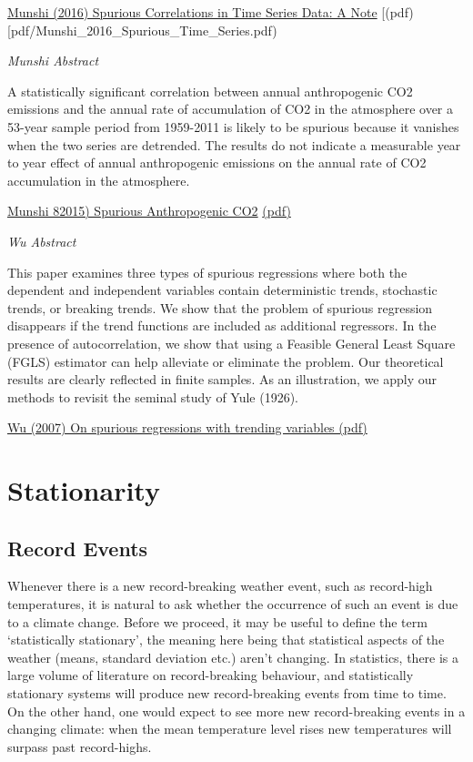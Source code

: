 \documentclass[
]{book}
\begin{document}
\href{https://www.researchgate.net/publication/306376553_Spurious_Correlations_in_Time_Series_Data_A_Note}{Munshi (2016) Spurious Correlations in Time Series Data: A Note}
{[}(pdf){[}pdf/Munshi\_2016\_Spurious\_Time\_Series.pdf)

\emph{Munshi Abstract}

A statistically significant correlation between annual anthropogenic CO2 emissions and the annual rate of accumulation of CO2 in the atmosphere over a 53-year sample period from 1959-2011 is likely to be spurious because it vanishes when the two series are detrended. The results do not indicate a measurable year to year effect of annual anthropogenic emissions on the annual rate of CO2 accumulation in the atmosphere.

\href{https://papers.ssrn.com/sol3/papers.cfm?abstract_id=2642639}{Munshi 82015) Spurious Anthropogenic CO2}
\href{pdf/Munshi_2015_Spurious_Antropogenic_CO2.pdf}{(pdf)}

\emph{Wu Abstract}

This paper examines three types of spurious regressions where both the dependent and
independent variables contain deterministic trends, stochastic trends, or breaking trends. We
show that the problem of spurious regression disappears if the trend functions are included as
additional regressors. In the presence of autocorrelation, we show that using a Feasible General
Least Square (FGLS) estimator can help alleviate or eliminate the problem. Our theoretical
results are clearly reflected in finite samples. As an illustration, we apply our methods to revisit
the seminal study of Yule (1926).

\href{pdf/Wu_2007_Spurious_Trending.pdf}{Wu (2007) On spurious regressions with trending variables (pdf)}

\hypertarget{stationarity}{%
\chapter{Stationarity}\label{stationarity}}

\hypertarget{record-events}{%
\section{Record Events}\label{record-events}}

Whenever there is a new record-breaking weather event, such as record-high temperatures, it is natural to ask whether the occurrence of such an event is due to a climate change. Before we proceed, it may be useful to define the term `statistically stationary', the meaning here being that statistical aspects of the weather (means, standard deviation etc.) aren't changing. In statistics, there is a large volume of literature on record-breaking behaviour, and statistically stationary systems will produce new record-breaking events from time to time. On the other hand, one would expect to see more new record-breaking events in a changing climate: when the mean temperature level rises new temperatures will surpass past record-highs.
\end{document}
